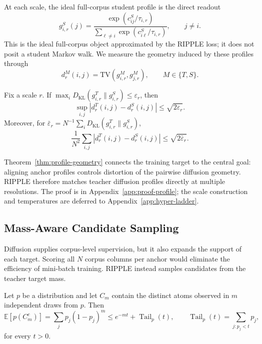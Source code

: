 At each scale, the ideal full-corpus student profile is the direct readout
\begin{equation}
\label{eq:student-global-profile}
g^S_{i,r}(j)
=\frac{\exp(c^S_{ij}/\tau_{i,r})}
{\sum_{\ell\neq i}\exp(c^S_{i\ell}/\tau_{i,r})},
\qquad j\neq i.
\end{equation}
This is the ideal full-corpus object approximated by the RIPPLE loss; it does not posit a student Markov walk. We measure the geometry induced by these profiles through
\begin{equation}
\label{eq:diffusion-distance}
d_r^M(i,j)=\mathrm{TV}(g^M_{i,r},g^M_{j,r}),
\qquad M\in\{T,S\}.
\end{equation}

\begin{theorem}
\label{thm:profile-geometry}
Fix a scale $r$. If
$\max_i D_{\mathrm{KL}}(g^T_{i,r}\|g^S_{i,r})\leq\varepsilon_r$, then
\begin{equation}
\label{eq:profile-uniform-bound}
\sup_{i,j}|d_r^T(i,j)-d_r^S(i,j)|
\leq\sqrt{2\varepsilon_r}.
\end{equation}
Moreover, for
$\bar\varepsilon_r=N^{-1}\sum_iD_{\mathrm{KL}}(g^T_{i,r}\|g^S_{i,r})$,
\begin{equation}
\label{eq:profile-average-bound}
\frac1{N^2}\sum_{i,j}|d_r^T(i,j)-d_r^S(i,j)|
\leq\sqrt{2\bar\varepsilon_r}.
\end{equation}
\end{theorem}

Theorem~\ref{thm:profile-geometry} connects the training target to the central goal: aligning anchor profiles controls distortion of the pairwise diffusion geometry. RIPPLE therefore matches teacher diffusion profiles directly at multiple resolutions. The proof is in Appendix~\ref{app:proof-profile}; the scale construction and temperatures are deferred to Appendix~\ref{app:hyper-ladder}.

\subsection{Mass-Aware Candidate Sampling}
\label{sec:candidates}

Diffusion supplies corpus-level supervision, but it also expands the support of each target. Scoring all $N$ corpus columns per anchor would eliminate the efficiency of mini-batch training. RIPPLE instead samples candidates from the teacher target mass.

\begin{lemma}
\label{lem:sampling}
Let $p$ be a distribution and let $C_m$ contain the distinct atoms observed in $m$ independent draws from $p$. Then
\begin{equation}
\label{eq:sampling-mass}
\mathbb E[p(C_m^c)]
=\sum_jp_j(1-p_j)^m
\leq e^{-mt}+\operatorname{Tail}_p(t),
\qquad
\operatorname{Tail}_p(t)=\sum_{j:p_j<t}p_j,
\end{equation}
for every $t>0$.
\end{lemma}

